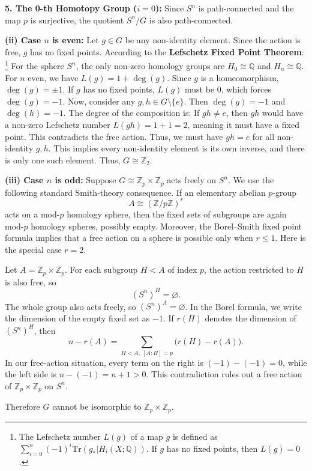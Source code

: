 \begin{solution}
\textbf{5. The 0-th Homotopy Group ($i = 0$):}
Since $S^n$ is path-connected and the map $p$ is surjective, the quotient $S^n/G$ is also path-connected.

\textbf{(ii) Case $n$ is even:}
Let $g \in G$ be any non-identity element. Since the action is free, $g$ has no fixed points.
According to the \textbf{Lefschetz Fixed Point Theorem}:
\footnote{The Lefschetz number $L(g)$ of a map $g$ is defined as $\sum_{i=0}^n (-1)^i \text{Tr}(g_* | H_i(X; \mathbb{Q}))$. If $g$ has no fixed points, then $L(g) = 0$.}
For the sphere $S^n$, the only non-zero homology groups are $H_0 \cong \mathbb{Q}$ and $H_n \cong \mathbb{Q}$.
For $n$ even, we have $L(g) = 1 + \deg(g)$.
Since $g$ is a homeomorphism, $\deg(g) = \pm 1$.
If $g$ has no fixed points, $L(g)$ must be $0$, which forces $\deg(g) = -1$.
Now, consider any $g, h \in G \setminus \{e\}$. Then $\deg(g) = -1$ and $\deg(h) = -1$.
The degree of the composition is:
If $gh \neq e$, then $gh$ would have a non-zero Lefschetz number $L(gh) = 1+1 = 2$, meaning it must have a fixed point.
This contradicts the free action. Thus, we must have $gh = e$ for all non-identity $g, h$.
This implies every non-identity element is its own inverse, and there is only one such element.
Thus, $G \cong \mathbb{Z}_2$.

\textbf{(iii) Case $n$ is odd:}
Suppose $G \cong \mathbb{Z}_p \times \mathbb{Z}_p$ acts freely on $S^n$.
We use the following standard Smith-theory consequence. If an elementary abelian
$p$-group
\[
    A\cong(\mathbb{Z}/p\mathbb{Z})^r
\]
acts on a mod-$p$ homology sphere, then the fixed sets of subgroups are again
mod-$p$ homology spheres, possibly empty. Moreover, the Borel--Smith fixed point
formula implies that a free action on a sphere is possible only when $r\leq 1$.
Here is the special case $r=2$.

Let $A=\mathbb{Z}_p\times\mathbb{Z}_p$. For each subgroup $H<A$ of index $p$,
the action restricted to $H$ is also free, so
\[
    (S^n)^H=\varnothing.
\]
The whole group also acts freely, so $(S^n)^A=\varnothing$. In the Borel formula,
we write the dimension of the empty fixed set as $-1$. If $r(H)$ denotes the
dimension of $(S^n)^H$, then
\[
    n-r(A)=\sum_{H<A,\ [A:H]=p}\bigl(r(H)-r(A)\bigr).
\]
In our free-action situation, every term on the right is $(-1)-(-1)=0$, while the
left side is $n-(-1)=n+1>0$. This contradiction rules out a free action of
$\mathbb{Z}_p\times\mathbb{Z}_p$ on $S^n$.

Therefore $G$ cannot be isomorphic to $\mathbb{Z}_p\times\mathbb{Z}_p$.
\end{solution}

